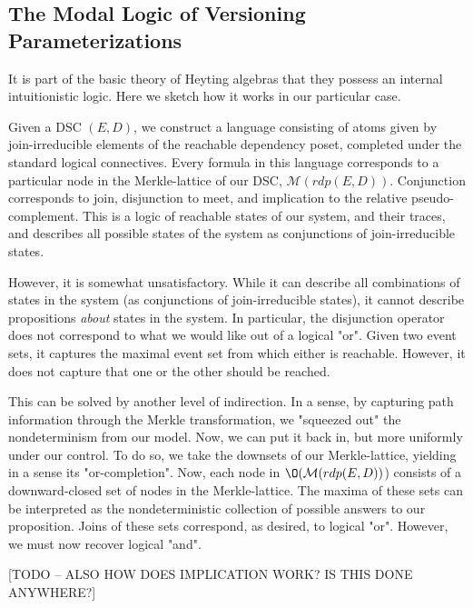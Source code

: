 \documentclass[hoptionsi,review,format=sigplan]{acmart}
\theoremstyle{definition}
\newcommand{\Mcc}{\mathcal{M}}
\begin{document}
\subsection{The Modal Logic of Versioning Parameterizations}
It is part of the basic theory of Heyting algebras that they possess an internal intuitionistic logic. Here we sketch how it works in our particular case.

Given a DSC \((E,D)\), we construct a language consisting of atoms given by join-irreducible elements of the reachable dependency poset, completed under the standard logical connectives. Every formula in this language corresponds to a particular node in the Merkle-lattice of our DSC, \(\Mcc(rdp(E,D))\).  Conjunction corresponds to join, disjunction to meet, and implication to the relative pseudo-complement. This is a logic of reachable states of our system, and their traces, and describes all possible states of the system as conjunctions of join-irreducible states.


However, it is somewhat unsatisfactory. While it can describe all combinations of states in the system (as conjunctions of join-irreducible states), it cannot describe propositions \textit{about} states in the system. In particular, the disjunction operator does not correspond to what we would like out of a logical "or". Given two event sets, it captures the maximal event set from which either is reachable. However, it does not capture that one or the other should be reached.

This can be solved by another level of indirection. In a sense, by capturing path information through the Merkle transformation, we "squeezed out" the nondeterminism from our model. Now, we can put it back in, but more uniformly under our control. To do so, we take the downsets of our Merkle-lattice, yielding in a sense its "or-completion". Now, each node in  \(\O(\Mcc(rdp(E,D))\)) consists of a downward-closed set of nodes in the Merkle-lattice. The maxima of these sets can be interpreted as the nondeterministic collection of possible answers to our proposition. Joins of these sets correspond, as desired, to logical "or". However, we must now recover logical "and". 

[TODO -- ALSO HOW DOES IMPLICATION WORK? IS THIS DONE ANYWHERE?]









\end{document}
